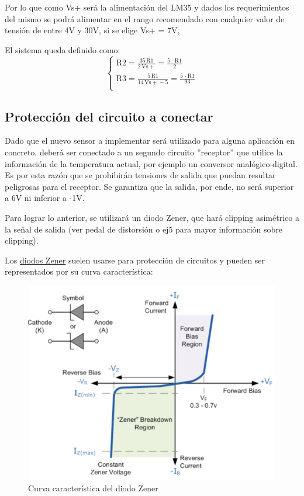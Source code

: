 \documentclass[../../main.tex]{subfiles}
\begin{document}
\begin{itemize}
 	
 	Por lo que como Vs+ será la alimentación del LM35 y dados los requerimientos del mismo se podrá alimentar en el rango recomendado con cualquier valor de tensión de entre 4V y 30V, si se elige Vs+ = 7V, \par

 El sistema queda definido como:
 		 \begin{equation}
  	   \left\{
	  	    \begin{array}{ll}
		 					\mathrm{R2} = \frac{35\, \mathrm{R1}}{2\, \mathrm{Vs+}} = \frac{5\, \cdot\mathrm{R1}}{2}\\
			 				\mathrm{R3} = \frac{5\, \mathrm{R1}}{14\, \mathrm{Vs+} - 5} = \frac{5\, \cdot\mathrm{R1}}{93}\\
	     	 \end{array}
	     	\right.
 	\end{equation}

\end{itemize}
\subsection{Protección del circuito a conectar}

Dado que el nuevo sensor a implementar será utilizado para alguna aplicación en concreto, deberá ser conectado a un segundo circuito ''receptor'' que utilice la información de la temperatura actual, por ejemplo un conversor analógico-digital. Es por esta razón que se prohibirán tensiones de salida que puedan resultar peligrosas para el receptor. Se garantiza que la salida, por ende, no será superior a 6V ni inferior a -1V. \par
Para lograr lo anterior, se utilizará un diodo Zener, que hará clipping asimétrico a la señal de salida (ver pedal de distorsión o ej5 para mayor información sobre clipping).\par
Los \underline{diodos Zener} suelen usarse para protección de circuitos y pueden ser representados por su curva característica:

\begin{figure}[H]	%
	\centering
	\includegraphics[scale=0.5]{imagenes/zener_diode_curva.png}
	\caption{Curva característica del diodo Zener}
	\label{fig:ej6_zener_diode_curva}
\end{figure}
\end{document}
